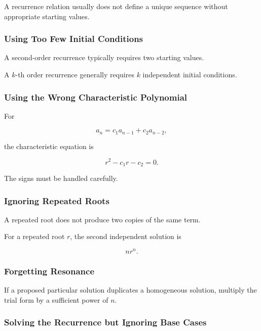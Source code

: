 A recurrence relation usually does not define a unique sequence without
appropriate starting values.

\subsubsection{Using Too Few Initial Conditions}

A second-order recurrence typically requires two starting values.

A \(k\)-th order recurrence generally requires \(k\) independent initial
conditions.

\subsubsection{Using the Wrong Characteristic Polynomial}

For

\[
a_n
=
c_1a_{n-1}
+
c_2a_{n-2},
\]

the characteristic equation is

\[
\boxed{
r^2-c_1r-c_2=0.
}
\]

The signs must be handled carefully.

\subsubsection{Ignoring Repeated Roots}

A repeated root does not produce two copies of the same term.

For a repeated root \(r\), the second independent solution is

\[
nr^n.
\]

\subsubsection{Forgetting Resonance}

If a proposed particular solution duplicates a homogeneous solution,
multiply the trial form by a sufficient power of \(n\).

\subsubsection{Solving the Recurrence but Ignoring Base Cases}

